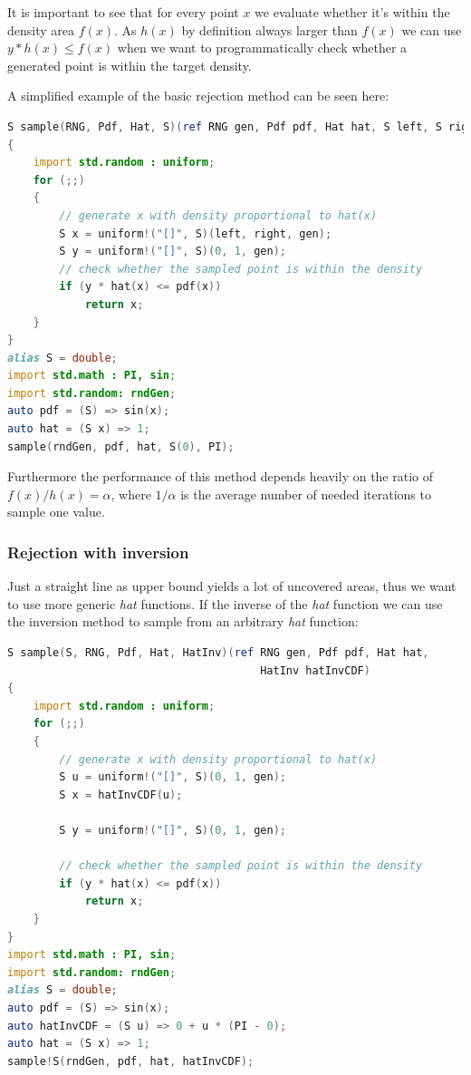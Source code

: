 It is important to see that for every point $x$ we evaluate whether it's within the density area $f(x)$. As $h(x)$ by definition always larger than $f(x)$ we can use $y * h(x) \leq f(x)$ when we want to programmatically check whether a generated point is within the target density.

A simplified example of the basic rejection method can be seen here:

\begin{minipage}{\linewidth}
\begin{lstlisting}[language=D]
S sample(RNG, Pdf, Hat, S)(ref RNG gen, Pdf pdf, Hat hat, S left, S right)
{
    import std.random : uniform;
    for (;;)
    {
        // generate x with density proportional to hat(x)
        S x = uniform!("[]", S)(left, right, gen);
        S y = uniform!("[]", S)(0, 1, gen);
        // check whether the sampled point is within the density
        if (y * hat(x) <= pdf(x))
            return x;
    }
}
alias S = double;
import std.math : PI, sin;
import std.random: rndGen;
auto pdf = (S) => sin(x);
auto hat = (S x) => 1;
sample(rndGen, pdf, hat, S(0), PI);
\end{lstlisting}
\end{minipage}

Furthermore the performance of this method depends heavily on the ratio of $f(x) / h(x) = \alpha$, where $1 / \alpha$ is the average number of needed iterations to sample one value.

\subsubsection{Rejection with inversion}

Just a straight line as upper bound yields a lot of uncovered areas, thus we want to use more generic \textit{hat} functions. If the inverse of the \textit{hat} function we can use the inversion method to sample from an arbitrary \textit{hat} function:

\begin{minipage}{0.9\linewidth}
\begin{lstlisting}[language=D]
S sample(S, RNG, Pdf, Hat, HatInv)(ref RNG gen, Pdf pdf, Hat hat,
                                       HatInv hatInvCDF)
{
    import std.random : uniform;
    for (;;)
    {
        // generate x with density proportional to hat(x)
        S u = uniform!("[]", S)(0, 1, gen);
        S x = hatInvCDF(u);

        S y = uniform!("[]", S)(0, 1, gen);

        // check whether the sampled point is within the density
        if (y * hat(x) <= pdf(x))
            return x;
    }
}
import std.math : PI, sin;
import std.random: rndGen;
alias S = double;
auto pdf = (S) => sin(x);
auto hatInvCDF = (S u) => 0 + u * (PI - 0);
auto hat = (S x) => 1;
sample!S(rndGen, pdf, hat, hatInvCDF);
\end{lstlisting}
\end{minipage}


